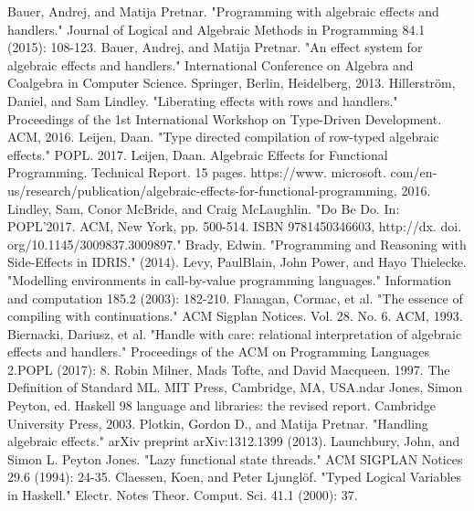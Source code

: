 \documentclass[12pt]{book}
\begin{document}
\newpage
\begin{thebibliography}{9}
Bauer, Andrej, and Matija Pretnar. "Programming with algebraic effects and handlers." Journal of Logical and Algebraic Methods in Programming 84.1 (2015): 108-123.
Bauer, Andrej, and Matija Pretnar. "An effect system for algebraic effects and handlers." International Conference on Algebra and Coalgebra in Computer Science. Springer, Berlin, Heidelberg, 2013.
Hillerstr\"{o}m, Daniel, and Sam Lindley. "Liberating effects with rows and handlers." Proceedings of the 1st International Workshop on Type-Driven Development. ACM, 2016.
Leijen, Daan. "Type directed compilation of row-typed algebraic effects." POPL. 2017.
Leijen, Daan. Algebraic Effects for Functional Programming. Technical Report. 15 pages. https://www. microsoft. com/en-us/research/publication/algebraic-effects-for-functional-programming, 2016.
Lindley, Sam, Conor McBride, and Craig McLaughlin. "Do Be Do. In: POPL'2017. ACM, New York, pp. 500-514. ISBN 9781450346603, http://dx. doi. org/10.1145/3009837.3009897."
Brady, Edwin. "Programming and Reasoning with Side-Effects in IDRIS." (2014).
Levy, PaulBlain, John Power, and Hayo Thielecke. "Modelling environments in call-by-value programming languages." Information and computation 185.2 (2003): 182-210.
Flanagan, Cormac, et al. "The essence of compiling with continuations." ACM Sigplan Notices. Vol. 28. No. 6. ACM, 1993.
Biernacki, Dariusz, et al. "Handle with care: relational interpretation of algebraic effects and handlers." Proceedings of the ACM on Programming Languages 2.POPL (2017): 8.
Robin Milner, Mads Tofte, and David Macqueen. 1997. The Definition of Standard ML. MIT Press, Cambridge, MA, USA.ndar
Jones, Simon Peyton, ed. Haskell 98 language and libraries: the revised report. Cambridge University Press, 2003.
Plotkin, Gordon D., and Matija Pretnar. "Handling algebraic effects." arXiv preprint arXiv:1312.1399 (2013).
Launchbury, John, and Simon L. Peyton Jones. "Lazy functional state threads." ACM SIGPLAN Notices 29.6 (1994): 24-35.
Claessen, Koen, and Peter Ljunglöf. "Typed Logical Variables in Haskell." Electr. Notes Theor. Comput. Sci. 41.1 (2000): 37.
\end{thebibliography}
\end{document}
